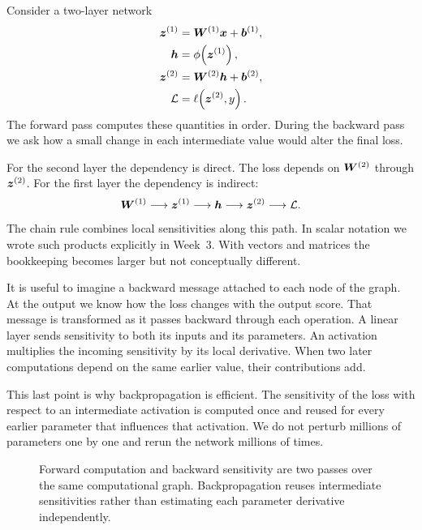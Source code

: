 Consider a two-layer network
\begin{align}
  \bm{z}^{(1)} &= \bm{W}^{(1)}\bm{x}+\bm{b}^{(1)},\\
  \bm{h} &= \phi\!\left(\bm{z}^{(1)}\right),\\
  \bm{z}^{(2)} &= \bm{W}^{(2)}\bm{h}+\bm{b}^{(2)},\\
  \mathcal{L} &= \ell\!\left(\bm{z}^{(2)},y\right).
\end{align}
The forward pass computes these quantities in order. During the backward pass we ask how a small change in each intermediate value would alter the final loss.

For the second layer the dependency is direct. The loss depends on \(\bm{W}^{(2)}\) through \(\bm{z}^{(2)}\). For the first layer the dependency is indirect:
\[
  \bm{W}^{(1)}
  \longrightarrow \bm{z}^{(1)}
  \longrightarrow \bm{h}
  \longrightarrow \bm{z}^{(2)}
  \longrightarrow \mathcal{L}.
\]
The chain rule combines local sensitivities along this path. In scalar notation we wrote such products explicitly in Week~3. With vectors and matrices the bookkeeping becomes larger but not conceptually different.

It is useful to imagine a backward message attached to each node of the graph. At the output we know how the loss changes with the output score. That message is transformed as it passes backward through each operation. A linear layer sends sensitivity to both its inputs and its parameters. An activation multiplies the incoming sensitivity by its local derivative. When two later computations depend on the same earlier value, their contributions add.

This last point is why backpropagation is efficient. The sensitivity of the loss with respect to an intermediate activation is computed once and reused for every earlier parameter that influences that activation. We do not perturb millions of parameters one by one and rerun the network millions of times.

\begin{figure}[ht]
  \caption{Forward computation and backward sensitivity are two passes over the same computational graph. Backpropagation reuses intermediate sensitivities rather than estimating each parameter derivative independently.}
  \label{fig:week4-backprop}
\end{figure}


